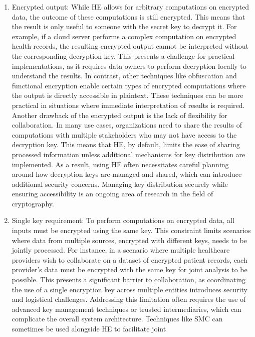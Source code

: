 \documentclass[
  letterpaper,
  DIV=11,
  numbers=noendperiod,
  oneside]{scrartcl}
\begin{document}
\begin{enumerate}
\def\labelenumi{\arabic{enumi}.}
\item
  Encrypted output: While HE allows for arbitrary computations on
  encrypted data, the outcome of these computations is still encrypted.
  This means that the result is only useful to someone with the secret
  key to decrypt it. For example, if a cloud server performs a complex
  computation on encrypted health records, the resulting encrypted
  output cannot be interpreted without the corresponding decryption key.
  This presents a challenge for practical implementations, as it
  requires data owners to perform decryption locally to understand the
  results. In contrast, other techniques like obfuscation and functional
  encryption enable certain types of encrypted computations where the
  output is directly accessible in plaintext. These techniques can be
  more practical in situations where immediate interpretation of results
  is required. Another drawback of the encrypted output is the lack of
  flexibility for collaboration. In many use cases, organizations need
  to share the results of computations with multiple stakeholders who
  may not have access to the decryption key. This means that HE, by
  default, limits the ease of sharing processed information unless
  additional mechanisms for key distribution are implemented. As a
  result, using HE often necessitates careful planning around how
  decryption keys are managed and shared, which can introduce additional
  security concerns. Managing key distribution securely while ensuring
  accessibility is an ongoing area of research in the field of
  cryptography.
\item
  Single key requirement: To perform computations on encrypted data, all
  inputs must be encrypted using the same key. This constraint limits
  scenarios where data from multiple sources, encrypted with different
  keys, needs to be jointly processed. For instance, in a scenario where
  multiple healthcare providers wish to collaborate on a dataset of
  encrypted patient records, each provider's data must be encrypted with
  the same key for joint analysis to be possible. This presents a
  significant barrier to collaboration, as coordinating the use of a
  single encryption key across multiple entities introduces security and
  logistical challenges. Addressing this limitation often requires the
  use of advanced key management techniques or trusted intermediaries,
  which can complicate the overall system architecture. Techniques like
  SMC can sometimes be used alongside HE to facilitate joint

\end{enumerate}
\end{document}
